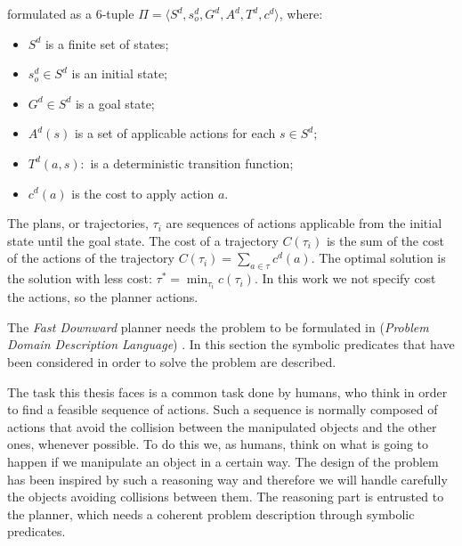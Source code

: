  formulated as a $6$-tuple $\Pi=\langle S^d, s_o^d, G^d, A^d, T^d, c^d \rangle$, where:
\begin{itemize}
\item $S^d$ is a finite set of states;
\item $s_o^d \in S^d$ is an initial state;
\item $G^d \in S^d$ is a goal state;
\item $A^d(s)$ is a set of applicable actions for each $s \in S^d$;
\item $T^d(a,s) :$  is a deterministic transition function;
\item $c^d(a)$ is the cost to apply action $a$.
\end{itemize}
The plans, or trajectories, $\tau_i$ are sequences of actions applicable from the initial state until the goal state. The cost of a trajectory $C(\tau_i)$ is the sum of the cost of the actions of the trajectory $C(\tau_i) = \sum_{a \in \tau} c^d(a)$. The optimal solution is the solution with less cost: $\tau^* = \min_{\tau_i} c(\tau_i)$.
In this work we  not specify  cost  the actions, so the planner  actions.


The \textit{Fast Downward} planner needs the problem to be formulated in  (\textit{Problem Domain Description Language}) \citep{pddl}. In this section the symbolic predicates that have been considered in order to solve the problem are described.

The task this thesis faces is a common task done by humans, who think in order to find a feasible sequence of actions. Such a sequence is normally composed of actions that avoid the collision between the manipulated objects and the other ones, whenever possible. To do this we, as humans, think on what is going to happen if we manipulate an object in a certain way. The design of the problem has been inspired by such a reasoning way and therefore we will handle carefully the objects avoiding collisions between them. The reasoning part is entrusted to the planner, which needs a coherent problem description through symbolic predicates. 

